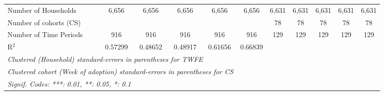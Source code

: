 \begin{table}[htbp]
\begin{tabular}{@{}l@{}c@{}c@{}c@{}c@{}c@{}c@{}c@{}c@{}c@{}c@{}}
      Number of Households  &  6,656           &  6,656           &  6,656            &  6,656            &  6,656           & 6,631 & 6,631 & 6,631 & 6,631 & 6,631 \\
Number of cohorts (CS) & &  &  &  &  & 78 & 78 & 78 & 78 & 78 \\
      Number of Time Periods          &  916             &  916             &  916              &  916              &  916             & 129 & 129 & 129 & 129 & 129 \\
      R$^2$                           &  0.57299         &  0.48652         &  0.48917          &  0.61656          &  0.66839         &  &  &  &  &  \\
      \midrule \midrule
\multicolumn{10}{l}{\emph{Clustered (Household) standard-errors in parentheses for TWFE}}\\
\multicolumn{5}{l}{\emph{Clustered cohort (Week of adoption) standard-errors in parentheses for CS}}\\
      \multicolumn{11}{l}{\emph{Signif. Codes: ***: 0.01, **: 0.05, *: 0.1}}\\
   \end{tabular}
\end{table}


